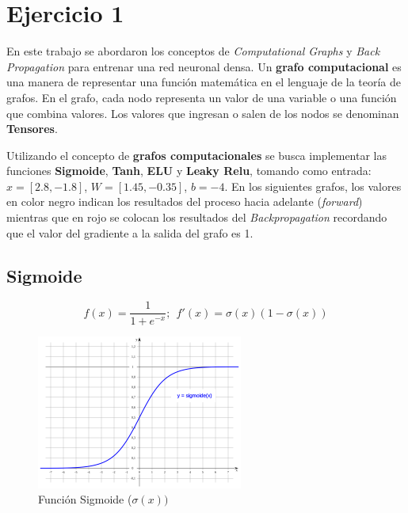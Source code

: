 \section{Ejercicio 1}

En este trabajo se abordaron los conceptos de \textit{Computational Graphs} y \textit{Back Propagation} para entrenar una red neuronal densa.
Un \textbf{grafo computacional} es una manera de representar una función matemática en el lenguaje de la teoría de grafos. En el grafo, cada nodo representa un valor de una variable o una función que combina valores. Los valores que ingresan o salen de los nodos se denominan \textbf{Tensores}.

Utilizando el concepto de \textbf{grafos computacionales} se busca implementar las funciones \textbf{Sigmoide}, \textbf{Tanh}, \textbf{ELU} y \textbf{Leaky Relu}, tomando como entrada:
$x=[2.8, -1.8]$, $W=[1.45, -0.35]$, $b=-4$. En los siguientes grafos, los valores en color negro indican los resultados del proceso hacia adelante (\textit{forward}) mientras que en rojo se colocan los resultados del \textit{Backpropagation} recordando que el valor del gradiente a la salida del grafo es 1.

\subsection{Sigmoide}

\begin{equation}
    f(x)=\frac{1}{1+e^{-x}};\ \ f'(x)=\sigma(x)(1-\sigma(x))
\end{equation}
\vspace{1cm}
\hspace{1.5cm}

\newline

\begin{figure}[H]
    \centering
    \includegraphics[height=2in]{image/sigmoide}
    \caption{Función Sigmoide ($\sigma(x))$}
    \label{fig:my_label}
\end{figure}


